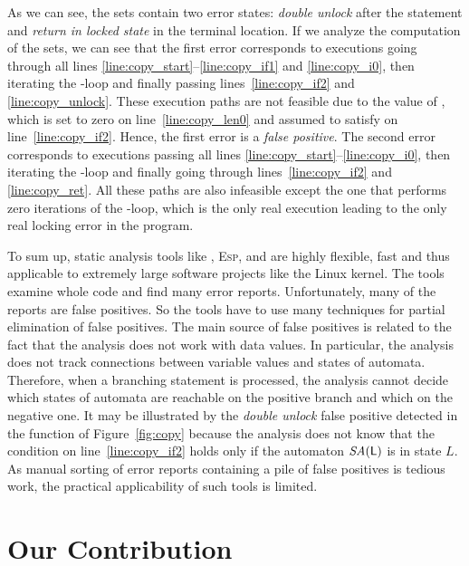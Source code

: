 As we can see, the sets contain two error states: \emph{double unlock} after
the  statement and \emph{return in locked state} in the
terminal location. If we analyze the computation of the sets, we can see
that the first error corresponds to executions going through all lines
\ref{line:copy_start}--\ref{line:copy_if1} and \ref{line:copy_i0}, then
iterating the -loop and finally passing lines~\ref{line:copy_if2}
and \ref{line:copy_unlock}.  These execution paths are not feasible due to the
value of , which is set to zero on line~\ref{line:copy_len0} and
assumed to satisfy  on line~\ref{line:copy_if2}. Hence, the
first error is a \emph{false positive}. The second error corresponds to
executions passing all lines \ref{line:copy_start}--\ref{line:copy_i0}, then
iterating the -loop and finally going through
lines~\ref{line:copy_if2} and \ref{line:copy_ret}. All these paths are also
infeasible except the one that performs zero iterations of the
-loop, which is the only real execution leading to the only real
locking error in the program.

To sum up, static analysis tools like \xgcc, \textsc{Esp}, and \stan are
highly flexible, fast and thus applicable to extremely large software projects
like the Linux kernel. The tools examine whole code and find many error
reports. Unfortunately, many of the reports are false positives. So the tools
have to use many techniques for partial elimination of false positives.  The
main source of false positives is related to the fact that the analysis does
not work with data values. In particular, the analysis does not track
connections between variable values and states of automata.  Therefore, when a
branching statement is processed, the analysis cannot decide which states of
automata are reachable on the positive branch and which on the negative one.
It may be illustrated by the \emph{double unlock} false positive detected in
the function of Figure~\ref{fig:copy} because the analysis does not know that
the condition on line~\ref{line:copy_if2} holds only if the automaton
${\textit{SA}}(\mathsf{L})$ is in state $L$. As manual sorting of error reports containing
a pile of false positives is tedious work, the practical applicability of such
tools is limited.

\section{Our Contribution}

